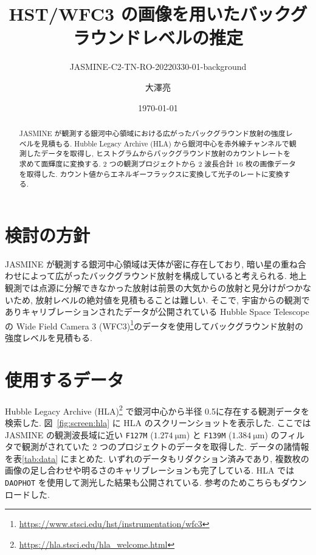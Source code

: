 \documentclass[10pt,a4paper,dvipdfmx,uplatex]{jsarticle}
\title{HST/WFC3 の画像を用いたバックグラウンドレベルの推定}
\subtitle{JASMINE-C2-TN-RO-20220330-01-background}
\author{大澤亮}
\date{\today}
\begin{document}
\maketitle

\begin{abstract}
  JASMINE が観測する銀河中心領域における広がったバックグラウンド放射の強度レベルを見積もる. Hubble Legacy Archive (HLA) から銀河中心を赤外線チャンネルで観測したデータを取得し, ヒストグラムからバックグラウンド放射のカウントレートを求めて面輝度に変換する. 2 つの観測プロジェクトから 2 波長合計 16 枚の画像データを取得した. カウント値からエネルギーフラックスに変換して光子のレートに変換する.
\end{abstract}

\section{検討の方針}
JASMINE が観測する銀河中心領域は天体が密に存在しており, 暗い星の重ね合わせによって広がったバックグラウンド放射を構成していると考えられる. 地上観測では点源に分解できなかった放射は前景の大気からの放射と見分けがつかないため, 放射レベルの絶対値を見積もることは難しい. そこで, 宇宙からの観測でありキャリブレーションされたデータが公開されている Hubble Space Telescope の Wide Field Camera 3 (WFC3)\footnote{\url{https://www.stsci.edu/hst/instrumentation/wfc3}}のデータを使用してバックグラウンド放射の強度レベルを見積もる.


\section{使用するデータ}
Hubble Legacy Archive (HLA)\footnote{\url{https://hla.stsci.edu/hla_welcome.html}} で銀河中心から半径 0.5\deg に存在する観測データを検索した. 図~\ref{fig:screen:hla} に HLA のスクリーンショットを表示した. ここでは JASMINE の観測波長域に近い \texttt{F127M} ($\SI{1.274}{\micro\meter}$) と \texttt{F139M} ($\SI{1.384}{\micro\meter}$) のフィルタで観測がされていた 2 つのプロジェクトのデータを取得した. データの諸情報を表\ref{tab:data} にまとめた. いずれのデータもリダクション済みであり, 複数枚の画像の足し合わせや明るさのキャリブレーションも完了している. HLA では \texttt{DAOPHOT} を使用して測光した結果も公開されている. 参考のためこちらもダウンロードした.
\end{document}
